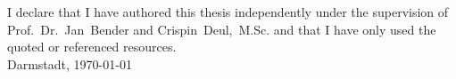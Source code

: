 \vspace*{130mm}
\begin{minipage}{129.5mm}

  I declare that I have authored this thesis independently under the
  supervision of Prof.~Dr.~Jan~Bender and Crispin~Deul,~M.Sc.
  and that I have only used the quoted or referenced resources. \\ [20mm]	

Darmstadt, \today

\end{minipage}
\renewcommand{\thepage}{\arabic{page}}
\setcounter{page}{1}
\newpage



